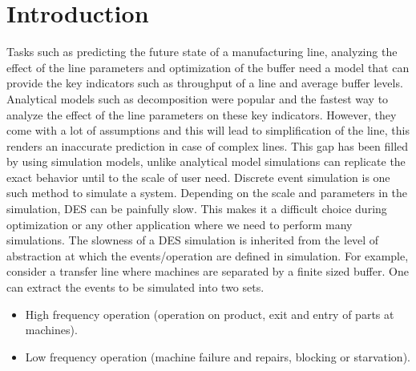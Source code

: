 \section{Introduction}
Tasks such as predicting the future state of a manufacturing line, analyzing the effect of the line parameters and optimization of the buffer need a model that can provide the key indicators such as throughput of a line and average buffer levels. Analytical models such as decomposition were popular and the fastest way to analyze the effect of the line parameters on these key indicators. However, they come with a lot of assumptions and this will lead to simplification of the line, this renders an inaccurate prediction in case of complex lines. This gap has been filled by using simulation models, unlike analytical model simulations can replicate the exact behavior until to the scale of user need. Discrete event simulation is one such method to simulate a system. Depending on the scale and parameters in the simulation, DES can be painfully slow. This makes it a difficult choice during optimization or any other application where we need to perform many simulations. The slowness of a DES simulation is inherited from the level of abstraction at which the events/operation are defined in simulation. For example, consider a transfer line where machines are separated by a finite sized buffer. One can extract the events to be simulated into two sets. \par
\begin{itemize}
    \item High frequency operation (operation on product, exit and entry of parts at machines). 
    \item Low frequency operation (machine failure and repairs, blocking or starvation).
\end{itemize}

